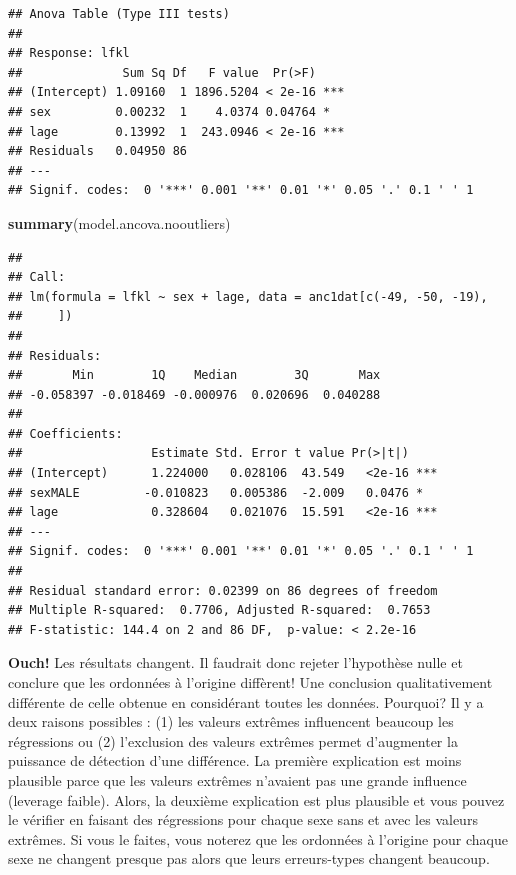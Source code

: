 \documentclass[12pt,]{book}
\newenvironment{Shaded}{\begin{snugshade}}{\end{snugshade}}
\newcommand{\KeywordTok}[1]{\textcolor[rgb]{0.13,0.29,0.53}{\textbf{#1}}}
\newcommand{\NormalTok}[1]{#1}
\begin{document}
\begin{verbatim}
## Anova Table (Type III tests)
## 
## Response: lfkl
##              Sum Sq Df   F value  Pr(>F)    
## (Intercept) 1.09160  1 1896.5204 < 2e-16 ***
## sex         0.00232  1    4.0374 0.04764 *  
## lage        0.13992  1  243.0946 < 2e-16 ***
## Residuals   0.04950 86                      
## ---
## Signif. codes:  0 '***' 0.001 '**' 0.01 '*' 0.05 '.' 0.1 ' ' 1
\end{verbatim}

\begin{Shaded}
\begin{Highlighting}[]
\KeywordTok{summary}\NormalTok{(model.ancova.nooutliers)}
\end{Highlighting}
\end{Shaded}

\begin{verbatim}
## 
## Call:
## lm(formula = lfkl ~ sex + lage, data = anc1dat[c(-49, -50, -19), 
##     ])
## 
## Residuals:
##       Min        1Q    Median        3Q       Max 
## -0.058397 -0.018469 -0.000976  0.020696  0.040288 
## 
## Coefficients:
##                  Estimate Std. Error t value Pr(>|t|)    
## (Intercept)      1.224000   0.028106  43.549   <2e-16 ***
## sexMALE         -0.010823   0.005386  -2.009   0.0476 *  
## lage             0.328604   0.021076  15.591   <2e-16 ***
## ---
## Signif. codes:  0 '***' 0.001 '**' 0.01 '*' 0.05 '.' 0.1 ' ' 1
## 
## Residual standard error: 0.02399 on 86 degrees of freedom
## Multiple R-squared:  0.7706, Adjusted R-squared:  0.7653 
## F-statistic: 144.4 on 2 and 86 DF,  p-value: < 2.2e-16
\end{verbatim}

\textbf{Ouch!} Les résultats changent. Il faudrait donc rejeter l'hypothèse nulle et conclure que les ordonnées à l'origine diffèrent! Une conclusion qualitativement différente de celle obtenue en considérant toutes les données. Pourquoi? Il y a deux raisons possibles : (1) les valeurs extrêmes influencent beaucoup les régressions ou (2) l'exclusion des valeurs extrêmes permet d'augmenter la puissance de détection d'une différence. La première explication est moins plausible parce que les valeurs extrêmes n'avaient pas une grande influence (leverage faible). Alors, la deuxième explication est plus plausible et vous pouvez le vérifier en faisant des régressions pour chaque sexe sans et avec les valeurs extrêmes. Si vous le faites, vous noterez que les ordonnées à l'origine pour chaque sexe ne changent presque pas alors que leurs erreurs-types changent beaucoup.
\end{document}
